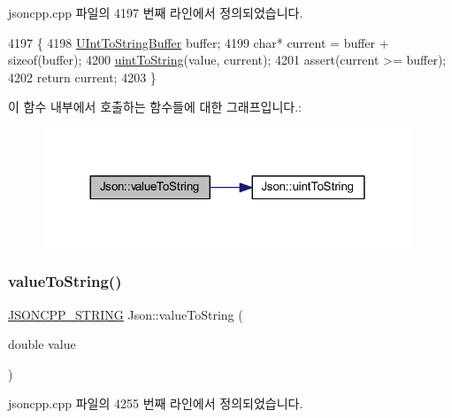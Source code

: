 jsoncpp.\+cpp 파일의 4197 번째 라인에서 정의되었습니다.


\begin{DoxyCode}
4197                                                 \{
4198   \hyperlink{namespace_json_a602bcf69c2042fb61c3b243cb16f04ca}{UIntToStringBuffer} buffer;
4199   \textcolor{keywordtype}{char}* current = buffer + \textcolor{keyword}{sizeof}(buffer);
4200   \hyperlink{namespace_json_ac1ffd21a9e55122014353c773ccc496e}{uintToString}(value, current);
4201   assert(current >= buffer);
4202   \textcolor{keywordflow}{return} current;
4203 \}
\end{DoxyCode}
이 함수 내부에서 호출하는 함수들에 대한 그래프입니다.\+:\nopagebreak
\begin{figure}[H]
\begin{center}
\leavevmode
\includegraphics[width=312pt]{namespace_json_a6283ea3db02efe9104ae6baff698245a_cgraph}
\end{center}
\end{figure}
\mbox{\label{namespace_json_a3cf0c8dbbdb898c4a6fad54670b34bd1}} 
\subsubsection{\texorpdfstring{value\+To\+String()}{valueToString()}\hspace{0.1cm}{\footnotesize\ttfamily [5/6]}}
{\footnotesize\ttfamily \hyperlink{json_8h_a1e723f95759de062585bc4a8fd3fa4be}{J\+S\+O\+N\+C\+P\+P\+\_\+\+S\+T\+R\+I\+NG} Json\+::value\+To\+String (\begin{DoxyParamCaption}\item[{double}]{value }\end{DoxyParamCaption})}



jsoncpp.\+cpp 파일의 4255 번째 라인에서 정의되었습니다.


